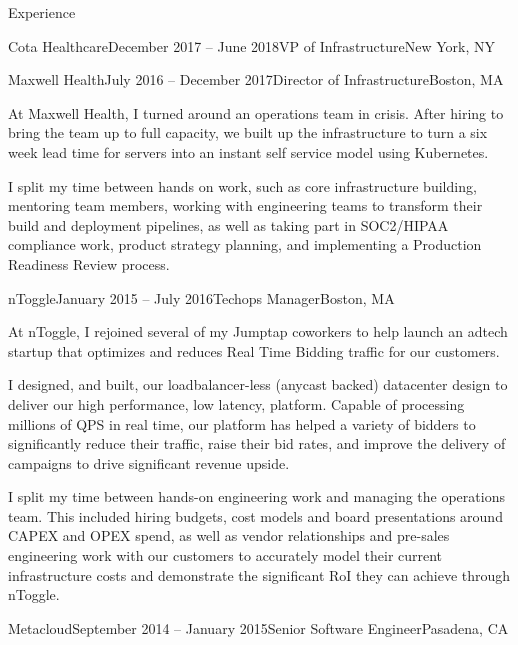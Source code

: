 \documentclass{resume} %
\begin{document}
\begin{rSection}{Experience}
\begin{rSubsection}{Cota Healthcare}{December 2017 -- June 2018}{VP of Infrastructure}{New York, NY}
\end{rSubsection}

\begin{rSubsection}{Maxwell Health}{July 2016 -- December 2017}{Director of Infrastructure}{Boston, MA}

\item[] At Maxwell Health, I turned around an operations team in crisis.  After
  hiring to bring the team up to full capacity, we built up the infrastructure
  to turn a six week lead time for servers into an instant self service model
  using Kubernetes.

I split my time between hands on work, such as core infrastructure building,
  mentoring team members, working with engineering teams to transform their
  build and deployment pipelines, as well as taking part in SOC2/HIPAA
  compliance work, product strategy planning, and implementing a Production
  Readiness Review process.

\end{rSubsection}

\begin{rSubsection}{nToggle}{January 2015 -- July 2016}{Techops Manager}{Boston, MA}

\item[] At nToggle, I rejoined several of my Jumptap coworkers to help launch
  an adtech startup that optimizes and reduces Real Time Bidding traffic for
  our customers.

I designed, and built, our loadbalancer-less (anycast backed) datacenter design
  to deliver our high performance, low latency, platform.  Capable of
  processing millions of QPS in real time, our platform has helped a variety of
  bidders to significantly reduce their traffic, raise their bid rates, and
  improve the delivery of campaigns to drive significant revenue upside.  

I split my time between hands-on engineering work and managing the operations
  team.  This included hiring budgets, cost models and board presentations
  around CAPEX and OPEX spend, as well as vendor relationships and pre-sales
  engineering work with our customers to accurately model their current
  infrastructure costs and demonstrate the significant RoI they can achieve
  through nToggle.

\end{rSubsection}

\begin{rSubsection}{Metacloud}{September 2014 -- January 2015}{Senior Software Engineer}{Pasadena, CA}


\end{rSubsection}
\end{rSection}
\end{document}
